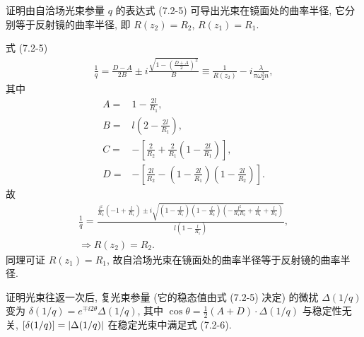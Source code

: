\documentclass{note}
\begin{document}
\begin{exe}
    证明由自洽场光束参量 $q$ 的表达式 (7.2-5) 可导出光束在镜面处的曲率半径, 它分别等于反射镜的曲率半径, 即 $R(z_2)=R_2$, $R(z_1)=R_1$.
\end{exe}
\begin{pf}
    式 (7.2-5)
    \begin{align}
        \frac{1}{q}=\frac{D-A}{2B}\pm i\frac{\sqrt{1-\left(\frac{D+A}{2}\right)^2}}{B}\equiv\frac{1}{R(z_2)}-i\frac{\lambda}{\pi\omega_2^2n},
    \end{align}
    其中
    \begin{align}
        A=&1-\frac{2l}{R_1},\\
        B=&l\left(2-\frac{2l}{R_1}\right),\\
        C=&-\left[\frac{2}{R_2}+\frac{2}{R_1}\left(1-\frac{2l}{R_1}\right)\right],\\
        D=&-\left[\frac{2l}{R_2}-\left(1-\frac{2l}{R_1}\right)\left(1-\frac{2l}{R_2}\right)\right].
    \end{align}
    故
    \begin{gather}
        \frac{1}{q}=\frac{\frac{l^2}{R_2}\left(-1+\frac{l}{R_1}\right)\pm i\sqrt{\left(1-\frac{l}{R_1}\right)\left(1-\frac{l}{R_2}\right)\left(-\frac{l^2}{R_1R_2}+\frac{l}{R_1}+\frac{l}{R_2}\right)}}{l\left(1-\frac{l}{R_1}\right)},\\
        \Longrightarrow R(z_2)=R_2.
    \end{gather}
    同理可证 $R(z_1)=R_1$, 故自洽场光束在镜面处的曲率半径等于反射镜的曲率半径.
\end{pf}

\begin{exe}
    证明光束往返一次后, 复光束参量 (它的稳态值由式 (7.2-5) 决定) 的微扰 $\Delta(1/q)$ 变为 $\delta(1/q)=e^{\mp i2\theta}\Delta(1/q)$, 其中 $\cos\theta=\frac{1}{2}(A+D)\cdot\Delta(1/q)$ 与稳定性无关, $[\delta(1/q)]=\left\lvert\Delta(1/q)\right\rvert$ 在稳定光束中满足式 (7.2-6).
\end{exe}
\begin{pf}
    
\end{pf}
\ifx\allfiles\undefined
\end{document}
